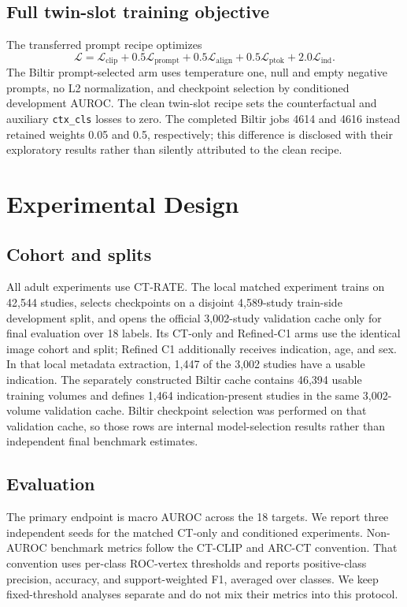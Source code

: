 \documentclass[10pt,twocolumn]{article}
\begin{document}
\subsection{Full twin-slot training objective}
The transferred prompt recipe optimizes
\begin{equation}
\mathcal{L}=\mathcal{L}_{\mathrm{clip}}
+0.5\mathcal{L}_{\mathrm{prompt}}
+0.5\mathcal{L}_{\mathrm{align}}
+0.5\mathcal{L}_{\mathrm{ptok}}
+2.0\mathcal{L}_{\mathrm{ind}}.
\end{equation}
The Biltir prompt-selected arm uses temperature one, null and empty negative prompts,
no L2 normalization, and checkpoint selection by conditioned development
AUROC. The clean twin-slot recipe sets the counterfactual and auxiliary
\texttt{ctx\_cls} losses to zero. The completed Biltir jobs 4614 and 4616
instead retained weights 0.05 and 0.5, respectively; this difference is
disclosed with their exploratory results rather than silently attributed to
the clean recipe.

\section{Experimental Design}
\subsection{Cohort and splits}
All adult experiments use CT-RATE. The local matched experiment trains on
42,544 studies, selects checkpoints on a disjoint 4,589-study train-side
development split, and opens the official 3,002-study validation cache only
for final evaluation over 18 labels. Its CT-only and Refined-C1 arms use the
identical image cohort and split; Refined C1 additionally receives indication,
age, and sex. In that local metadata extraction, 1,447 of the 3,002 studies
have a usable indication. The separately constructed Biltir cache contains
46,394 usable training volumes and defines 1,464 indication-present studies in
the same 3,002-volume validation cache. Biltir checkpoint selection was
performed on that validation cache, so those rows are internal
model-selection results rather than independent final benchmark estimates.

\subsection{Evaluation}
The primary endpoint is macro AUROC across the 18 targets. We report three
independent seeds for the matched CT-only and conditioned experiments.
Non-AUROC benchmark metrics follow the CT-CLIP and ARC-CT convention. That
convention uses per-class ROC-vertex thresholds and reports positive-class
precision, accuracy, and support-weighted F1, averaged over classes. We keep
fixed-threshold analyses separate and do not mix their metrics into this
protocol.
\end{document}
